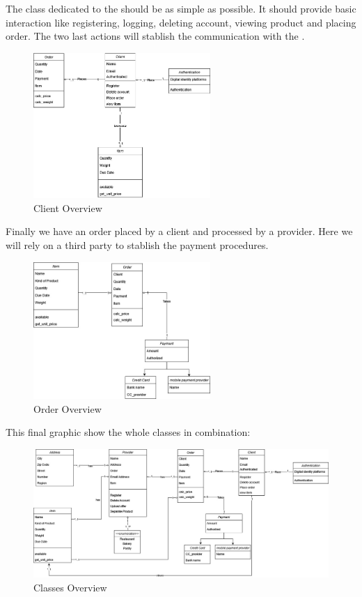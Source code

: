 The class dedicated to the  should be as simple as possible. It should provide basic interaction like
registering, logging, deleting account, viewing product and placing order. The two last actions will stablish the communication 
with the .

\begin{figure}[H]
    \centering
    \includegraphics[width=0.6\textwidth]{assets/client_CD.jpg}
    \caption{Client Overview}
    \label{fig:client_CD}
\end{figure}

Finally we have an order placed by a \gls{client} and processed by a \gls{provider}. Here we will rely on a third party 
to stablish the payment procedures.

\begin{figure}[H]
    \centering
    \includegraphics[width=0.6\textwidth]{assets/order_cd.jpg}
    \caption{Order Overview}
    \label{fig:order_cd}
\end{figure}

\newpage
\thispagestyle{lscape}
\begin{landscape}

This final graphic show the whole classes in combination:

\begin{figure}[H]
    \centering
    \includegraphics[width=1.5\textwidth]{assets/classes_CD.jpg}
    \caption{Classes Overview}
    \label{fig:class_CD}
\end{figure}

\end{landscape}
